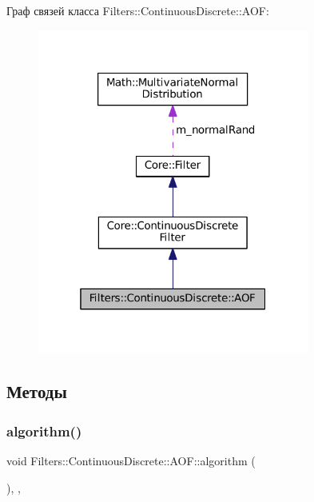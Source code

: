 Граф связей класса Filters\+:\+:Continuous\+Discrete\+:\+:A\+OF\+:
\nopagebreak
\begin{figure}[H]
\begin{center}
\leavevmode
\includegraphics[width=253pt]{class_filters_1_1_continuous_discrete_1_1_a_o_f__coll__graph}
\end{center}
\end{figure}


\subsection{Методы}
\hypertarget{class_filters_1_1_continuous_discrete_1_1_a_o_f_a050849ffe1ada992988218805721914d}{}\label{class_filters_1_1_continuous_discrete_1_1_a_o_f_a050849ffe1ada992988218805721914d} 
\subsubsection{\texorpdfstring{algorithm()}{algorithm()}}
{\footnotesize\ttfamily void Filters\+::\+Continuous\+Discrete\+::\+A\+O\+F\+::algorithm (\begin{DoxyParamCaption}{ }\end{DoxyParamCaption})\hspace{0.3cm}{\ttfamily [override]}, {\ttfamily [protected]}, {\ttfamily [virtual]}}



